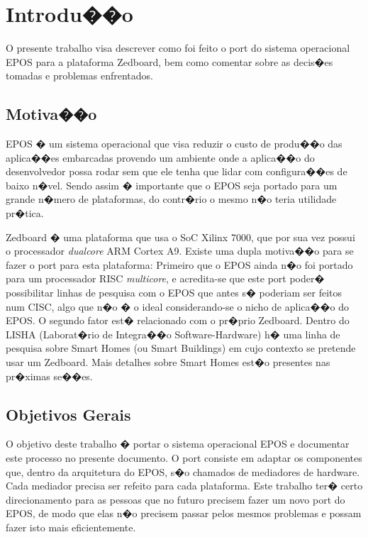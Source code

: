 \documentclass{ufscThesis/ufscThesis} %
\begin{document}
\folhaderosto[comficha] %
\folhaaprovacao
\paginadedicatoria
\paginaagradecimento
\paginaepigrafe
\paginaresumo
\paginaabstract
\listadefiguras %
\listadetabelas 
\listadeabreviaturas
\listadesimbolos
\sumario

\chapter{Introdu��o}

O presente trabalho visa descrever como foi feito o port do sistema operacional EPOS para a plataforma Zedboard, bem como comentar sobre as decis�es tomadas e problemas enfrentados.

\section{Motiva��o}
EPOS � um sistema operacional que visa reduzir o custo de produ��o das aplica��es embarcadas provendo um ambiente onde a aplica��o do desenvolvedor possa rodar sem que ele tenha que lidar com configura��es de baixo n�vel. Sendo assim � importante que o EPOS seja portado para um grande n�mero de plataformas, do contr�rio o mesmo n�o teria utilidade pr�tica.

Zedboard � uma plataforma que usa o SoC Xilinx 7000, que por sua vez possui o processador \emph{dualcore} ARM Cortex A9. Existe uma dupla motiva��o para se fazer o port para esta plataforma: Primeiro que o EPOS ainda n�o foi portado para um processador RISC \emph{multicore}, e acredita-se que este port poder� possibilitar linhas de pesquisa com o EPOS que antes s� poderiam ser feitos num CISC, algo que n�o � o ideal considerando-se o nicho de aplica��o do EPOS. O segundo fator est� relacionado com o pr�prio Zedboard. Dentro do LISHA (Laborat�rio de Integra��o Software-Hardware) h� uma linha de pesquisa sobre Smart Homes (ou Smart Buildings) em cujo contexto se pretende usar um Zedboard. Mais detalhes sobre Smart Homes est�o presentes nas pr�ximas se��es.

\section{Objetivos Gerais}

O objetivo deste trabalho � portar o sistema operacional EPOS e documentar este processo no presente documento. O port consiste em adaptar os componentes que, dentro da arquitetura do EPOS, s�o chamados de mediadores de hardware. Cada mediador precisa ser refeito para cada plataforma.
Este trabalho ter� certo direcionamento para as pessoas que no futuro precisem fazer um novo port do EPOS, de modo que elas n�o precisem passar pelos mesmos problemas e possam fazer isto mais eficientemente.
\end{document}
